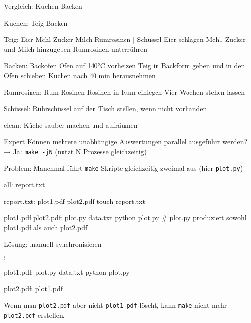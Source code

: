 \begin{frame}[fragile]{Vergleich: Kuchen Backen}
  \begin{center}
    \begin{lstmake}
    Kuchen: Teig Backen

    Teig: Eier Mehl Zucker Milch Rumrosinen | Schüssel
        Eier schlagen
        Mehl, Zucker und Milch hinzugeben
        Rumrosinen unterrühren

    Backen: Backofen
        Ofen auf 140°C vorheizen
        Teig in Backform geben und in den Ofen schieben
        Kuchen nach 40 min herausnehmen

    Rumrosinen: Rum Rosinen
        Rosinen in Rum einlegen
        Vier Wochen stehen lassen

    Schüssel:
	Rührschüssel auf den Tisch stellen, wenn nicht vorhanden

    clean:
        Küche sauber machen und aufräumen
    \end{lstmake}
  \end{center}
\end{frame}

\begin{frame}[fragile]{Expert}
  Können mehrere unabhängige Auswertungen parallel ausgeführt werden? \\
  → Ja: \texttt{make -jN} (nutzt N Prozesse gleichzeitig)

  Problem: Manchmal führt \texttt{make} Skripte gleichzeitig zweimal aus (hier \texttt{plot.py})
  \begin{center}
    \begin{lstmake}
      all: report.txt

      report.txt: plot1.pdf plot2.pdf
        touch report.txt

      plot1.pdf plot2.pdf: plot.py data.txt
        python plot.py  # plot.py produziert sowohl plot1.pdf als auch plot2.pdf
    \end{lstmake}
  \end{center}

  Lösung: manuell synchronisieren
  \begin{center}
    $\vdots$ \\
    \begin{lstmake}
      plot1.pdf: plot.py data.txt
          python plot.py

      plot2.pdf: plot1.pdf
    \end{lstmake}
  \end{center}

  Wenn man \texttt{plot2.pdf} aber nicht \texttt{plot1.pdf} löscht, kann \texttt{make} nicht mehr \texttt{plot2.pdf} erstellen.
\end{frame}
